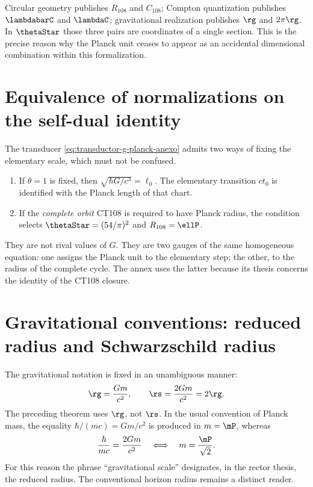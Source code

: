 \begin{remark}
Circular geometry publishes \(R_{108}\) and \(C_{108}\); Compton quantization
publishes \(\lambdabarC\) and \(\lambdaC\); gravitational realization
publishes \(\rg\) and \(2\pi\rg\). In \(\thetaStar\) those three pairs are
coordinates of a single section. This is the precise reason why the
Planck unit ceases to appear as an accidental dimensional combination
within this formalization.
\end{remark}

\section{Equivalence of normalizations on the self-dual identity}

The transducer \eqref{eq:transductor-g-planck-anexo} admits two ways of
fixing the elementary scale, which must not be confused.

\begin{enumerate}[label=\textup{(\roman*)}]
\item If \(\theta=1\) is fixed, then
\(\sqrt{\hbar G/c^3}=\ell_0\). The elementary transition \(ct_0\) is identified
with the Planck length of that chart.
\item If the \emph{complete orbit} CT108 is required to have Planck radius,
the condition selects \(\thetaStar=(54/\pi)^2\) and
\(R_{108}=\ellP\).
\end{enumerate}

They are not rival values of \(G\). They are two gauges of the same
homogeneous equation: one assigns the Planck unit to the elementary step; the other,
to the radius of the complete cycle. The annex uses the latter because its thesis concerns
the identity of the CT108 closure.

\section{Gravitational conventions: reduced radius and Schwarzschild radius}

The gravitational notation is fixed in an unambiguous manner:
\[
\rg=\frac{Gm}{c^2},
\qquad
\rs=\frac{2Gm}{c^2}=2\rg.
\]
The preceding theorem uses \(\rg\), not \(\rs\). In the usual convention of
Planck mass, the equality \(\hbar/(mc)=Gm/c^2\) is produced in \(m=\mP\),
whereas
\begin{equation}
\frac{\hbar}{mc}=\frac{2Gm}{c^2}
\quad\Longleftrightarrow\quad
m=\frac{\mP}{\sqrt2}.
\label{eq:cruce-schwarzschild-factor-dos}
\end{equation}
For this reason the phrase “gravitational scale” designates, in the rector thesis, the reduced
radius. The conventional horizon radius remains a distinct reader.

